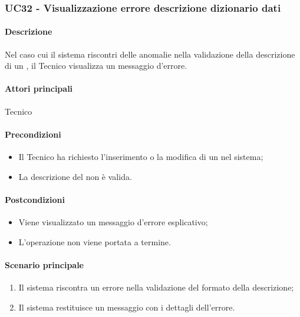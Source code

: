 \subsubsection{UC32 - Visualizzazione errore descrizione dizionario dati}\label{UC32}
\paragraph*{Descrizione}
Nel caso cui il sistema riscontri delle anomalie nella validazione della descrizione di un , il Tecnico visualizza un messaggio d'errore.

\paragraph*{Attori principali}
Tecnico

\paragraph*{Precondizioni}
\begin{itemize}
  \item Il Tecnico ha richiesto l'inserimento o la modifica di un  nel sistema;
  \item La descrizione del  non è valida.
\end{itemize}

\paragraph*{Postcondizioni}
\begin{itemize}
  \item Viene visualizzato un messaggio d'errore esplicativo;
  \item L'operazione non viene portata a termine.
\end{itemize}

\paragraph*{Scenario principale}
\begin{enumerate}
  \item Il sistema riscontra un errore nella validazione del formato della descrizione;
  \item Il sistema restituisce un messaggio con i dettagli dell'errore.  
\end{enumerate}